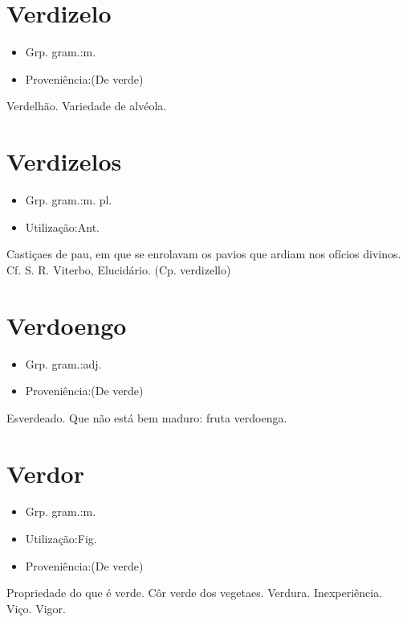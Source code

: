 \documentclass{article}
\begin{document}
\section{Verdizelo}
\begin{itemize}
\item {Grp. gram.:m.}
\end{itemize}
\begin{itemize}
\item {Proveniência:(De \textunderscore verde\textunderscore )}
\end{itemize}
Verdelhão.
Variedade de alvéola.
\section{Verdizelos}
\begin{itemize}
\item {Grp. gram.:m. pl.}
\end{itemize}
\begin{itemize}
\item {Utilização:Ant.}
\end{itemize}
Castiçaes de pau, em que se enrolavam os pavios que ardiam nos ofícios divinos. Cf. S. R. Viterbo, \textunderscore Elucidário\textunderscore .
(Cp. \textunderscore verdizello\textunderscore )
\section{Verdoengo}
\begin{itemize}
\item {Grp. gram.:adj.}
\end{itemize}
\begin{itemize}
\item {Proveniência:(De \textunderscore verde\textunderscore )}
\end{itemize}
Esverdeado.
Que não está bem maduro: \textunderscore fruta verdoenga\textunderscore .
\section{Verdor}
\begin{itemize}
\item {Grp. gram.:m.}
\end{itemize}
\begin{itemize}
\item {Utilização:Fig.}
\end{itemize}
\begin{itemize}
\item {Proveniência:(De \textunderscore verde\textunderscore )}
\end{itemize}
Propriedade do que é verde.
Côr verde dos vegetaes.
Verdura.
Inexperiência.
Viço.
Vigor.
\end{document}
